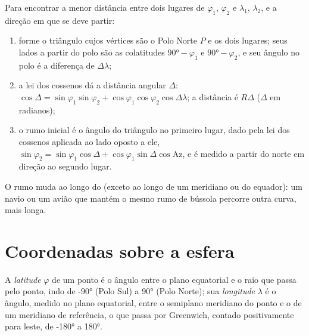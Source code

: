 \begin{method}\label{met:b1:spherical-astronomy:great-circle}
Para encontrar a menor distância entre dois lugares de  $\varphi_1$, $\varphi_2$ e  $\lambda_1$, $\lambda_2$, e a direção em que se deve partir:
\begin{enumerate}
  \item forme o triângulo cujos vértices são o Polo Norte $P$ e os dois lugares; seus lados a partir do polo são as colatitudes $\ang{90} -
        \varphi_1$ e $\ang{90} - \varphi_2$, e seu ângulo no polo é a diferença de  $\Delta\lambda$;
  \item a lei dos cossenos dá a distância angular $\Delta$:
        $\cos\Delta = \sin\varphi_1\sin\varphi_2 +
        \cos\varphi_1\cos\varphi_2\cos\Delta\lambda$; a distância é
        $R\Delta$ ($\Delta$ em radianos);
  \item o rumo inicial é o ângulo do triângulo no primeiro lugar, dado pela lei dos cossenos aplicada ao lado oposto a ele,
        $\sin\varphi_2 = \sin\varphi_1\cos\Delta + \cos\varphi_1\sin\Delta\cos
        \mathrm{Az}$, e é medido a partir do norte em direção ao segundo lugar.
\end{enumerate}
O rumo muda ao longo do  (exceto ao longo de um meridiano ou do equador): um navio ou um avião que mantém o mesmo rumo de bússola percorre outra curva, mais longa.
\end{method}

\section{Coordenadas sobre a esfera}

\begin{definition}\label{def:b1:spherical-astronomy:geographic}
A \emph{latitude} $\varphi$ de um ponto é o ângulo entre o plano equatorial e o raio que passa pelo ponto, indo de \ang{-90} (Polo Sul) a \ang{+90} (Polo Norte); sua \emph{longitude} $\lambda$ é o ângulo, medido no plano equatorial, entre o semiplano meridiano do ponto e o de um meridiano de referência, o que passa por Greenwich, contado positivamente para leste, de \ang{-180} a \ang{180}.
\end{definition}

